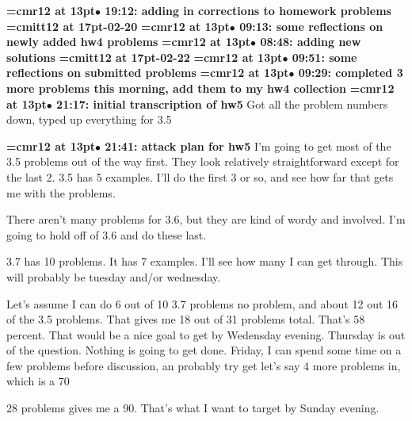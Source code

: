 {\smallskip\noindent\bf\font\titlefont=cmr12 at 13pt\titlefont $\bullet$ 19:12: adding in corrections to homework problems}\smallskip
{\medskip\noindent\bf\font\titlefont=cmitt12 at 17pt-02-20}\medskip
{\smallskip\noindent\bf\font\titlefont=cmr12 at 13pt\titlefont $\bullet$ 09:13: some reflections on newly added hw4 problems}\smallskip
{\smallskip\noindent\bf\font\titlefont=cmr12 at 13pt\titlefont $\bullet$ 08:48: adding new solutions}\smallskip
{\medskip\noindent\bf\font\titlefont=cmitt12 at 17pt-02-22}\medskip
{\smallskip\noindent\bf\font\titlefont=cmr12 at 13pt\titlefont $\bullet$ 09:51: some reflections on submitted problems}\smallskip
{\smallskip\noindent\bf\font\titlefont=cmr12 at 13pt\titlefont $\bullet$ 09:29: completed 3 more problems this morning, add them to my hw4 collection}\smallskip
{\smallskip\noindent\bf\font\titlefont=cmr12 at 13pt\titlefont $\bullet$ 21:17: initial transcription of hw5}\smallskip
Got all the problem numbers down, typed up everything for 3.5
\par

{\smallskip\noindent\bf\font\titlefont=cmr12 at 13pt\titlefont $\bullet$ 21:41: attack plan for hw5}\smallskip
I'm going to get most of the 3.5 problems out of the way first. They look relatively straightforward except for the last 2. 3.5 has 5 examples. I'll do the first 3 or so, and see how far that gets me with the problems.
\par

There aren't many problems for 3.6, but they are kind of wordy and involved. I'm going to hold off of 3.6 and do these last.
\par

3.7 has 10 problems. It has 7 examples. I'll see how many I can get through. This will probably be tuesday and/or wednesday.
\par

Let's assume I can do 6 out of 10 3.7 problems no problem, and about 12 out 16 of the 3.5 problems. That gives me 18 out of 31 problems total. That's 58 percent. That would be a nice goal to get by Wedensday evening. Thursday is out of the question. Nothing is going to get done. Friday, I can spend some time on a few problems before discussion, an probably try get let's say 4 more problems in, which is a 70%
\par

28 problems gives me a 90. That's what I want to target by Sunday evening.
\par

